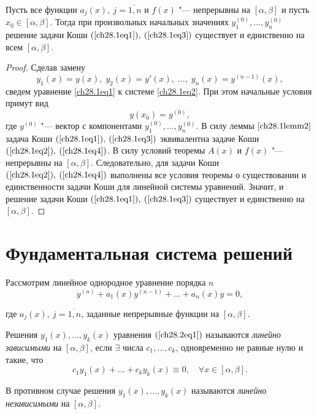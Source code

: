\begin{thm}
Пусть все функции $a_j(x), \: j = \overline{1,n}$ и $f(x)$ "--- непрерывны на $[\alpha, \beta]$ и пусть $x_0 \in [\alpha, \beta]$. Тогда при произвольных начальных значениях $y_1^{(0)}, \ldots, y_n^{(0)}$ решение задачи Коши $(\ref{ch28.1eq1}), \: (\ref{ch28.1eq3})$ существует и единственно на всем $[\alpha, \beta]$.
\end{thm}

\begin{proof}
Сделав замену 
$$
y_1(x) = y(x), \; y_2(x) = y'(x), \; \ldots, \; y_n(x) = y^{(n - 1)}(x),
$$
сведем уравнение \eqref{ch28.1eq1} к системе \eqref{ch28.1eq2}. При этом начальные условия примут вид
\begin{equation} \label{ch28.1eq4}
y(x_0) = y^{(0)},
\end{equation}
где $y^{(0)}$ "--- вектор с компонентами $y_1^{(0)}, \ldots, y_n^{(0)}$. В силу леммы $\ref{ch28.1lemm2}$ задача Коши $(\ref{ch28.1eq1}), \: (\ref{ch28.1eq3})$ эквивалентна задаче Коши $(\ref{ch28.1eq2}), \: (\ref{ch28.1eq4})$. В силу условий теоремы $A(x)$ и $f(x)$ "--- непрерывны на $[\alpha, \beta]$. Следовательно, для задачи Коши $(\ref{ch28.1eq2}), \: (\ref{ch28.1eq4})$ выполнены все условия теоремы о существовании и единственности задачи Коши для линейной системы уравнений. Значит, и решение задачи Коши $(\ref{ch28.1eq1}), \: (\ref{ch28.1eq3})$ существует и единственно на $[\alpha, \beta]$.
\end{proof}
\section{Фундаментальная система решений}

Рассмотрим линейное однородное уравнение порядка $n$
\begin{equation} \label{ch28.2eq1}
y^{(n)} + a_1(x)y^{(n - 1)} + \ldots + a_n(x)y = 0,
\end{equation} 

где $a_j(x), \: j = \overline{1,n}$, заданные непрерывные функции на $[\alpha, \beta]$.

\begin{defn}
Решения $y_1(x), \ldots, y_k(x)$ уравнения $(\ref{ch28.2eq1})$ называются \textit{линейно зависимыми} на $[\alpha, \beta]$, если $\exists$ числа $c_1, \ldots, c_k$, одновременно не равные нулю и такие, что 
$$
c_1y_1(x) + \ldots + c_ky_k(x) \equiv 0, \quad \forall x \in [\alpha, \beta].
$$

В противном случае решения $y_1(x), \ldots, y_k(x)$ называются \textit{линейно независимыми} на $[\alpha, \beta]$.
\end{defn}

